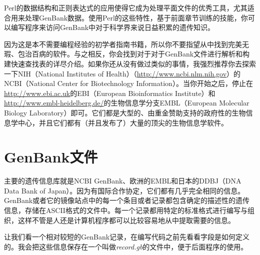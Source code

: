 Perl的数据结构和正则表达式的应用使得它成为处理平面文件的优秀工具，尤其适合用来处理GenBank数据。使用Perl的这些特性，基于前面章节训练的技能，你可以编写程序来访问GenBank中对于科学界来说日益积累的遗传知识。

因为这是本不需要编程经验的初学者指南书籍，所以你不要指望从中找到完美无瑕、包治百病的软件。与之相反，你会找到对于对于GenBank文件进行解析和构建快速查找表的详尽介绍。如果你还从没有做过类似的事情，我强烈推荐你去探索一下NIH（National Institutes of Health）（\href{http://www.ncbi.nlm.nih.gov}{http://www.ncbi.nlm.nih.gov}）的NCBI（National Center for Biotechnology Information）。当你开始之后，停止在\href{http://www.ebi.ac.uk}{http://www.ebi.ac.uk}的EBI（European Bioinformatics Institute）和\href{http://www.embl-heidelberg.de/}{http://www.embl-heidelberg.de/}的生物信息学分支EMBL（European Molecular Biology Laboratory）即可。它们都是大型的、由重金赞助支持的政府性的生物信息学中心，并且它们都有（并且发布了）大量的顶尖的生物信息学软件。

\section{GenBank文件}
主要的遗传信息库就是NCBI GenBank、欧洲的EMBL和日本的DDBJ（DNA Data Bank
of
Japan）。因为有国际合作协定，它们都有几乎完全相同的信息。GenBank或者它的镜像站点中的每一个条目或者记录都包含确定的描述性的遗传信息，存储在ASCII格式的文件中。每一个记录都用特定的标准格式进行编写与组织，这样不管是人还是计算机程序都可以比较容易地从中提取需要的信息。

让我们看一个相对较短的GenBank记录，在编写代码之前先看看字段是如何定义的。我会把这些信息保存在一个叫做\textit{record.gb}的文件中，便于后面程序的使用。

